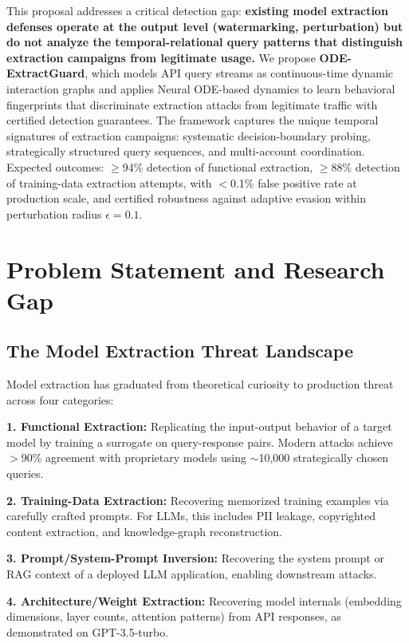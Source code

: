 \documentclass[12pt,a4paper]{article}
\begin{document}
This proposal addresses a critical detection gap: \textbf{existing model extraction defenses operate at the output level (watermarking, perturbation) but do not analyze the temporal-relational query patterns that distinguish extraction campaigns from legitimate usage.} We propose \textbf{ODE-ExtractGuard}, which models API query streams as continuous-time dynamic interaction graphs and applies Neural ODE-based dynamics to learn behavioral fingerprints that discriminate extraction attacks from legitimate traffic with certified detection guarantees. The framework captures the unique temporal signatures of extraction campaigns: systematic decision-boundary probing, strategically structured query sequences, and multi-account coordination. Expected outcomes: $\geq$94\% detection of functional extraction, $\geq$88\% detection of training-data extraction attempts, with $<$0.1\% false positive rate at production scale, and certified robustness against adaptive evasion within perturbation radius $\epsilon = 0.1$.

\section{Problem Statement and Research Gap}

\subsection{The Model Extraction Threat Landscape}

Model extraction has graduated from theoretical curiosity to production threat across four categories:

\textbf{1. Functional Extraction:} Replicating the input-output behavior of a target model by training a surrogate on query-response pairs. Modern attacks achieve $>$90\% agreement with proprietary models using $\sim$10,000 strategically chosen queries.

\textbf{2. Training-Data Extraction:} Recovering memorized training examples via carefully crafted prompts. For LLMs, this includes PII leakage, copyrighted content extraction, and knowledge-graph reconstruction.

\textbf{3. Prompt/System-Prompt Inversion:} Recovering the system prompt or RAG context of a deployed LLM application, enabling downstream attacks.

\textbf{4. Architecture/Weight Extraction:} Recovering model internals (embedding dimensions, layer counts, attention patterns) from API responses, as demonstrated on GPT-3.5-turbo.
\end{document}
